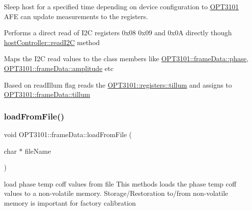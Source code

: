 \begin{DoxyItemize}
\item Sleep host for a specified time depending on device configuration to \mbox{\hyperlink{namespace_o_p_t3101}{O\+P\+T3101}} A\+FE can update measurements to the registers.
\item Performs a direct read of I2C registers 0x08 0x09 and 0x0A directly though \mbox{\hyperlink{classhost_controller_a2bee6b3ec45fac241484f7dad943d8ed}{host\+Controller\+::read\+I2C}} method ~\newline
~\newline

\item Maps the I2C read values to the class members like \mbox{\hyperlink{class_o_p_t3101_1_1frame_data_af8661d11405953dc378ad4d7cb0f2db6}{O\+P\+T3101\+::frame\+Data\+::phase}}, \mbox{\hyperlink{class_o_p_t3101_1_1frame_data_a16b903f0cea13dc66d751beab7271a18}{O\+P\+T3101\+::frame\+Data\+::amplitude}} etc ~\newline

\item Based on read\+Illum flag reads the \mbox{\hyperlink{class_o_p_t3101_1_1registers_a8a097a41ecdf2b98226c4a3a92121c12}{O\+P\+T3101\+::registers\+::tillum}} and assigns to \mbox{\hyperlink{class_o_p_t3101_1_1frame_data_aeb1934ab0ac8d1f846cf166ef26ceb75}{O\+P\+T3101\+::frame\+Data\+::tillum}} 
\end{DoxyItemize}\mbox{\label{class_o_p_t3101_1_1frame_data_aca9b96c6a896ee6caab380e05ae45064}} 
\subsubsection{\texorpdfstring{load\+From\+File()}{loadFromFile()}}
{\footnotesize\ttfamily void O\+P\+T3101\+::frame\+Data\+::load\+From\+File (\begin{DoxyParamCaption}\item[{char $\ast$}]{file\+Name }\end{DoxyParamCaption})}



load phase temp coff values from file This methods loads the phase temp coff values to a non-\/volatile memory. Storage/\+Restoration to/from non-\/volatile memory is important for factory calibration 


